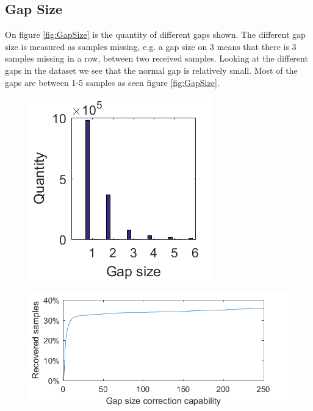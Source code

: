 \subsection{Gap Size}
On figure \ref{fig:GapSize} is the quantity of different gaps shown. The different gap size is measured as samples missing, e.g. a gap size on 3 means that there is 3 samples missing in a row, between two received samples. Looking at the different gaps in the dataset we see that the normal gap is relatively small. Most of the gaps are between 1-5 samples as seen figure \ref{fig:GapSize}.

\begin{figure}[H]
\centering
\begin{minipage}{.3\textwidth}
  \centering
  \includegraphics[width=1\linewidth]{billeder/GapInfo1.png}
  \label{fig:GapSize}
\end{minipage}%
\begin{minipage}{.8\textwidth}
  \centering
  \includegraphics[width=0.8\linewidth]{billeder/CorrectionCapability.png}
  \label{fig:GapCorrect}
\end{minipage}
\end{figure}

